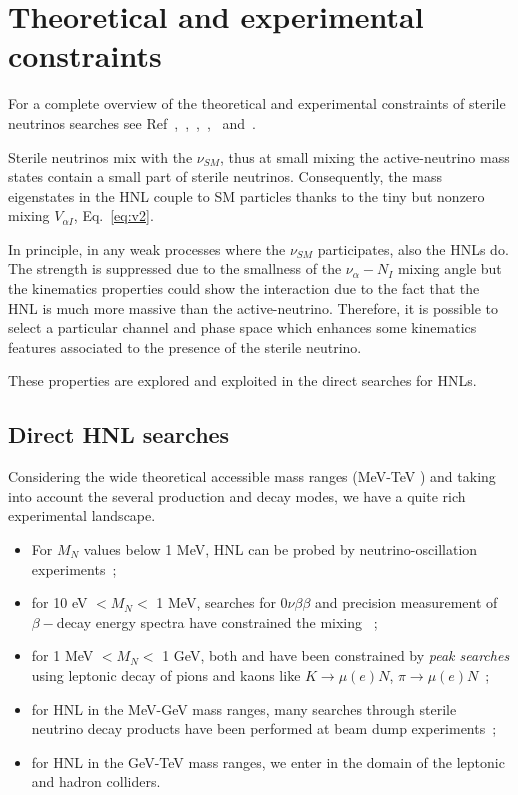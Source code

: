 \section{Theoretical and experimental constraints} \label{sec:currentlimits}
For a complete overview of the theoretical and experimental constraints of sterile neutrinos searches see Ref~\cite{Deppisch_2015},~\cite{10.3389/fphy.2018.00040},~\cite{PhysRevD.78.013010},~\cite{Drewes_2017},~\cite{DREWES2017250} and~\cite{Antusch_2014}.


Sterile neutrinos mix with the $\nu_{SM}$, thus at small mixing the
active-neutrino mass states contain a small part of sterile neutrinos. Consequently, the mass eigenstates in the HNL couple to SM particles thanks to the tiny but nonzero mixing $V_{\alpha I}$, Eq.~\ref{eq:v2}.

In principle, in any weak processes where the $\nu_{SM}$ participates, also the HNLs do. The strength is suppressed due to the smallness of the $\nu_\alpha - N_I$ mixing angle but the kinematics properties could show the interaction due to the fact that the HNL is much more massive than the active-neutrino.
Therefore, it is possible to select a particular channel and phase space which enhances some kinematics features associated to the presence of the sterile neutrino.

These properties are explored and exploited in the direct searches for HNLs.



\subsection{Direct HNL searches}
Considering the wide theoretical accessible mass ranges (MeV-TeV ) and taking into account
the several production and decay modes, we have a quite rich
experimental landscape. 
\begin{itemize}
\item For $M_N$ values below 1 MeV, HNL can be probed by
  neutrino-oscillation experiments~\cite{de_Gouv_a_2005};
\item for 10 eV $< M_N <$ 1 MeV, searches for
  $0\nu\beta\beta$ and precision measurement of $\beta-$decay energy
  spectra have constrained the mixing \mixpare~\cite{PhysRevLett.111.122503};
\item for 1 MeV $< M_N <$ 1 GeV, both \mixpare and \mixparm have been
  constrained by \emph{peak searches} using leptonic decay of pions
  and kaons like $K \rightarrow \mu(e) N$, $\pi \rightarrow \mu(e)
  N$~\cite{Liventsev_2013};
\item for HNL in the MeV-GeV mass ranges, many searches through
  sterile neutrino decay products have been performed at beam dump experiments~\cite{DORENBOSCH1986473};
\item for HNL in the GeV-TeV mass ranges, we enter in the domain of
  the leptonic and hadron colliders.
\end{itemize}

